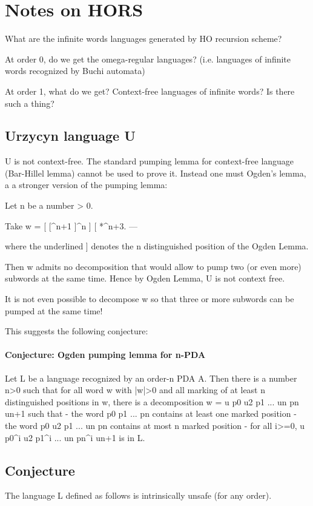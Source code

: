 \documentclass{article}
\begin{document}
\section{Notes on HORS}

What are the infinite words languages generated by HO recursion
scheme?

At order 0, do we get the omega-regular languages? (i.e. languages of
infinite words  recognized by Buchi automata)

At order 1, what do we get? Context-free languages of infinite words? Is
there such a thing?


\subsection{Urzycyn language U}

U is not context-free. The standard pumping lemma for context-free
language (Bar-Hillel lemma) cannot be used to prove it. Instead
one must Ogden's lemma, a a stronger version of the pumping lemma:

Let n be a number > 0.

Take w = [  [^{n+1}  ]^n  ]  [  *^{n+3}.
                     ---

where the underlined ] denotes the n distinguished position of the Ogden Lemma.

Then w admits no decomposition that would allow to pump two (or even
more) subwords at the same time. Hence by Ogden Lemma, U is not
context free.

It is not even possible to decompose w so that three or more
subwords can be pumped at the same time!

This suggests the following conjecture:

\paragraph{Conjecture: Ogden pumping lemma for n-PDA}
Let L be a language recognized by an order-n PDA A.
Then there is a number n>0 such that for all word w with |w|>0
and all marking of at least n distinguished positions in w,
there is a decomposition w = u p0  u2 p1  ...   un pn u{n+1} such that
- the word p0 p1 ... pn contains at least one marked position
- the word p0 u2 p1  ...  un pn contains at most n marked position
- for all i>=0, u p0^i u2 p1^i  ...   un pn^i u{n+1} is in L.



\subsection{Conjecture}
The language L defined as follows is intrinsically unsafe (for any order).
\end{document}
